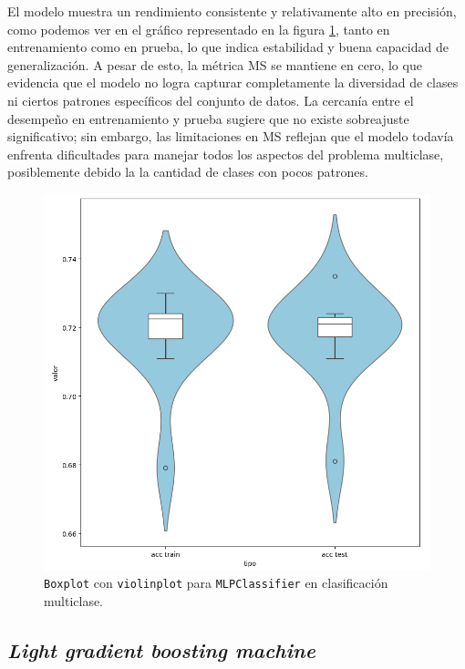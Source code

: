 El modelo muestra un rendimiento consistente y relativamente alto en precisión, como podemos ver en el gráfico representado en la figura \ref{fig:mlp_multi}, tanto en entrenamiento como en prueba, lo que indica estabilidad y buena capacidad de generalización. A pesar de esto, la métrica MS se mantiene en cero, lo que evidencia que el modelo no logra capturar completamente la diversidad de clases ni ciertos patrones específicos del conjunto de datos. La cercanía entre el desempeño en entrenamiento y prueba sugiere que no existe sobreajuste significativo; sin embargo, las limitaciones en MS reflejan que el modelo todavía enfrenta dificultades para manejar todos los aspectos del problema multiclase, posiblemente debido la la cantidad de clases con pocos patrones.

\begin{figure}[H]
	\centering
	\includegraphics[width=1\linewidth]{Imagenes/mlp_multi}
	\caption[\texttt{Boxplot} con \texttt{violinplot} para \texttt{MLPClassifier} en clasificación multiclase]{\texttt{Boxplot} con \texttt{violinplot} para \texttt{MLPClassifier} en clasificación multiclase.}
	\label{fig:mlp_multi}
\end{figure}

\newpage
\subsection{\textit{Light gradient boosting machine}}
\label{subsec:lgbm_multi}

